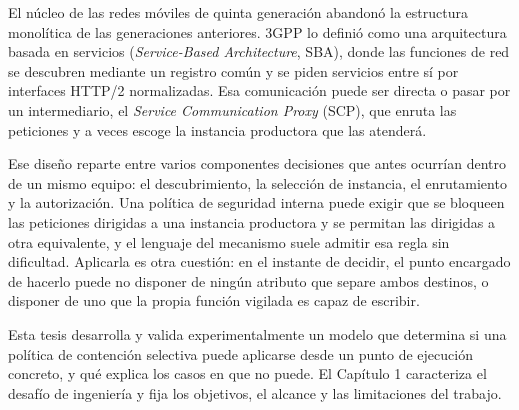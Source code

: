 \thispagestyle{plain}

El núcleo de las redes móviles de quinta generación abandonó la estructura monolítica de las generaciones anteriores. 3GPP lo definió como una arquitectura basada en servicios (\textit{Service-Based Architecture}, SBA), donde las funciones de red se descubren mediante un registro común y se piden servicios entre sí por interfaces HTTP/2 normalizadas. Esa comunicación puede ser directa o pasar por un intermediario, el \textit{Service Communication Proxy} (SCP), que enruta las peticiones y a veces escoge la instancia productora que las atenderá.

Ese diseño reparte entre varios componentes decisiones que antes ocurrían dentro de un mismo equipo: el descubrimiento, la selección de instancia, el enrutamiento y la autorización. Una política de seguridad interna puede exigir que se bloqueen las peticiones dirigidas a una instancia productora y se permitan las dirigidas a otra equivalente, y el lenguaje del mecanismo suele admitir esa regla sin dificultad. Aplicarla es otra cuestión: en el instante de decidir, el punto encargado de hacerlo puede no disponer de ningún atributo que separe ambos destinos, o disponer de uno que la propia función vigilada es capaz de escribir.

Esta tesis desarrolla y valida experimentalmente un modelo que determina si una política de contención selectiva puede aplicarse desde un punto de ejecución concreto, y qué explica los casos en que no puede. El Capítulo 1 caracteriza el desafío de ingeniería y fija los objetivos, el alcance y las limitaciones del trabajo.
